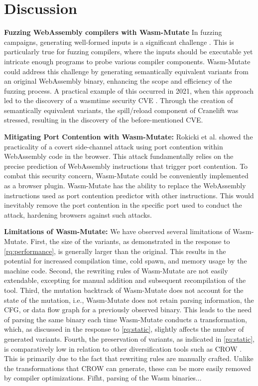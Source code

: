 \documentclass[a4paper,fleqn]{cas-dc}
\newcommand{\tool}{{\sc Wasm-Mutate}\xspace}
\newcommand{\Wasm}{WebAssembly\xspace}
\newcommand{\wasm}{\Wasm}
\newenvironment{revision1}{\color{blue}}{}
\begin{document}
\section{Discussion}
\label{discussion}


\textbf{Fuzzing \Wasm compilers with \tool}
In fuzzing campaigns, generating well-formed inputs is a significant challenge \cite{7958599}. 
This is particularly true for fuzzing compilers, where the inputs should be executable yet intricate enough programs to probe various compiler components. 
\tool could address this challenge by generating semantically equivalent variants from an original \wasm binary, enhancing the scope and efficiency of the fuzzing process. 
A practical example of this occurred in 2021, when this approach led to the discovery of a wasmtime security CVE \cite{CVE}. 
Through the creation of semantically equivalent variants, the spill/reload component of Cranelift was stressed, resulting in the discovery of the before-mentioned CVE.



\textbf{Mitigating Port Contention with \tool:} 
Rokicki et al. \cite{10.1145/3488932.3517411} showed the practicality of a covert side-channel attack using port contention within \Wasm code in the browser. This attack fundamentally relies on the precise prediction of WebAssembly instructions that trigger port contention.
To combat this security concern, \tool could be conveniently implemented as a browser plugin. 
\tool has the ability to replace the \wasm instructions used as port contention predictor with other instructions.
This would inevitably remove the port contention in the specific port used to conduct the attack, hardening browsers against such attacks.


\begin{revision1}
    
    \textbf{Limitations of \tool:} We have observed several limitations of \tool.
    First, the size of the variants, as demonstrated in the response to \ref{rq:performance}, is generally larger than the original. 
    This results in the potential for increased compilation time, cold spawn, and memory usage by the machine code. 
    Second, the rewriting rules of \tool are not easily extendable, excepting for manual addition and subsequent recompilation of the tool. 
    Third, the mutation backtrack of \tool does not account for the state of the mutation, i.e., \tool does not retain parsing information, the CFG, or data flow graph for a previously observed binary. 
    This leads to the need of parsing the same binary each time \tool conducts a transformation, which, as discussed in the response to \ref{rq:static}, slightly affects the number of generated variants. 
    Fourth, the preservation of variants, as indicated in \ref{rq:static}, is comparatively low in relation to other diversification tools such as CROW \cite{arteaga2020crow}. 
    This is primarily due to the fact that rewriting rules are manually crafted. 
    Unlike the transformations that CROW can generate, these can be more easily removed by compiler optimizations.
    Fifht, parsing of the Wasm binaries... 
    
\end{revision1}
\end{document}
